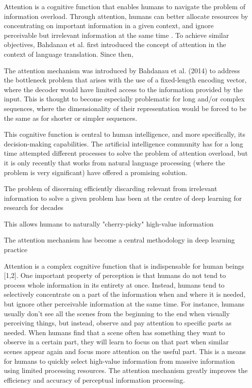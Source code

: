  
Attention is a cognitive function that enables humans to navigate the problem of information overload. Through attention, humans can better allocate resources by concentrating on important information in a given context, and ignore perceivable but irrelevant information at the same time \cite{attention_review}. To achieve similar objectives, Bahdanau et al. first introduced the concept of attention in the context of language translation. Since then,


The attention mechanism was introduced by Bahdanau et al. (2014) to address the bottleneck problem that arises with the use of a fixed-length encoding vector, where the decoder would have limited access to the information provided by the input. This is thought to become especially problematic for long and/or complex sequences, where the dimensionality of their representation would be forced to be the same as for shorter or simpler sequences.


This cognitive function is central to human intelligence, and more specifically, its decision-making capabilities. The artificial intelligence community has for a long time attempted different processes to solve the problem of attention overload, but it is only recently that works from natural language processing (where the problem is very significant) have offered a promising solution. 


The problem of discerning efficiently discarding relevant from irrelevant information to solve a given problem has been at the centre of deep learning for research for decades

This allows humans to naturally "cherry-picky" high-value information 

The attention mechanism has become a central methodology in deep learning practice 




Attention is a complex cognitive function that is indispensable
for human beings [1,2]. One important property of perception is
that humans do not tend to process whole information in its
entirety at once. Instead, humans tend to selectively concentrate
on a part of the information when and where it is needed, but
ignore other perceivable information at the same time. For
instance, humans usually don’t see all the scenes from the beginning to the end when visually perceiving things, but instead,
observe and pay attention to specific parts as needed. When
humans find that a scene often has something they want to
observe in a certain part, they will learn to focus on that part when
similar scenes appear again and focus more attention on the useful
part. This is a means for humans to quickly select high-value information from massive information using limited processing
resources. The attention mechanism greatly improves the efficiency and accuracy of perceptual information processing.

